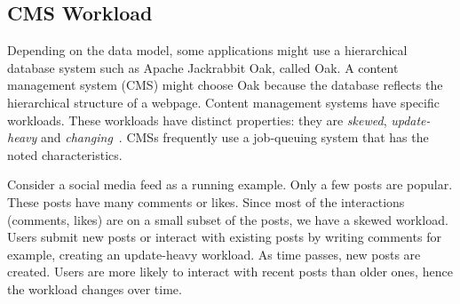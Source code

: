 \documentclass[abstracton,12pt]{scrartcl}
\theoremstyle{definition}
\begin{document}

\subsection{CMS Workload}

\label{sec:application_scenario}

Depending on the data model, some applications might use a hierarchical database
system such as Apache Jackrabbit Oak, called Oak. A content management system
(CMS) might choose Oak because
the database reflects the hierarchical structure of a webpage.
Content management systems have specific workloads.
These workloads have distinct properties: they are \textit{skewed},
\textit{update-heavy} and \textit{changing}~\cite{KW17}. CMSs frequently use a
job-queuing system that has the noted characteristics.

Consider a social media feed as a running example. Only a few posts are popular.
These posts have many comments or likes. Since most of the interactions
(comments, likes) are on a small subset of the posts, we have a skewed workload.
Users submit new posts or interact with existing posts by
writing comments for example, creating an update-heavy workload. As time
passes, new posts are created. Users are more likely to interact with recent
posts than older ones, hence the workload changes over time.
\end{document}
